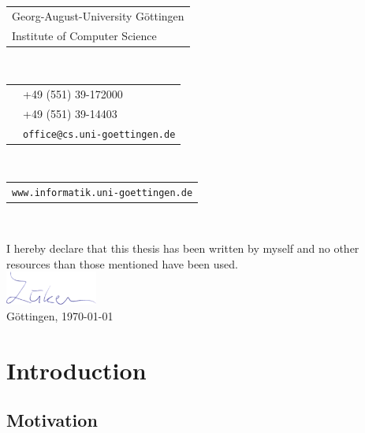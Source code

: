 \documentclass[a4paper, 11pt]{report}
\theoremstyle{definition}
\begin{document}
\restoregeometry
{}
\pagestyle{empty}
\pagebreak

\noindent
\begin{tabular}{l}
Georg-August-University Göttingen\\
Institute of Computer Science\\
\end{tabular}\\[1em]
\begin{tabular}{ll}
	\Telefon 	&+49 (551) 39-172000\\
	\FAX 		&+49 (551) 39-14403\\
	\Letter 	&\texttt{office@cs.uni-goettingen.de}\\
\end{tabular}\\[1em]
\begin{tabular}{l}
\texttt{www.informatik.uni-goettingen.de}\\
\end{tabular}\\[1em]
\pagebreak

\noindent I hereby declare that this thesis has been written by myself and no other resources than those mentioned have been used.\\[0.7em]
\phantom{H}\includegraphics[height=3em]{../assets/formal/sign.png}\\[0.5em]
Göttingen, \today \hspace{2em}
\pagebreak

\restoregeometry
\begin{abstract}
	\thispagestyle{plain}
	\setcounter{page}{3}
	\lipsum[1]
\end{abstract}
\pagebreak

\setcounter{page}{4}
\restoregeometry
{}
\tableofcontents
\pagebreak

\restoregeometry
{}
\setcounter{page}{1}
\pagestyle{headings}

\chapter{Introduction}
\section{Motivation}
\end{document}
